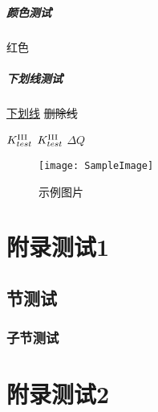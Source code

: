 \documentclass{../../PublicResources/DocClassLight}
\begin{document}
    \paragraph{\color{black}颜色测试}
    {\color{red} 红色}

    \paragraph{下划线测试}
    \uline{下划线}
    \sout{删除线}


     $K_{test}^{\text{\Rmnum{3}}}$ $K_{test}^{\mathrm{\Rmnum{3}}}$ $\Delta Q$

    \newpage
    \begin{figure}[h!]
        \centering
        \texttt{[image: SampleImage]}
        \caption{示例图片}
    \end{figure}

    \nocite{*} %
    \printbibliography %

    \appendix
    \chapter{附录测试1}
    \section{节测试}
    \subsection{子节测试}
    \chapter{附录测试2}
\end{document}
